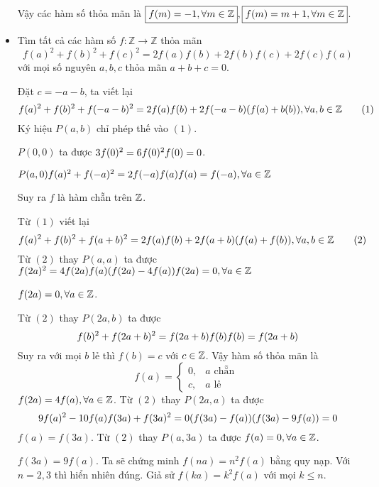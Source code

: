 \documentclass[11pt]{scrartcl}
\begin{document}
\begin{itemize}[label=, leftmargin=0em, itemsep=0.5em]
\begin{sol}
        Vậy các hàm số thỏa mãn là $\boxed{f(m) = -1, \forall m \in \mathbb{Z}},\boxed{f(m) = m +1, \forall m \in \mathbb{Z}}$.
    \end{sol}
    \item \begin{bt}
        Tìm tất cả các hàm số $f: \mathbb{Z} \to \mathbb{Z}$ thỏa mãn
        \[
          f(a)^2 + f(b)^2 + f(c)^2 = 2f(a)f(b) + 2f(b)f(c) + 2f(c)f(a)
        \]
        với mọi số nguyên $a,b,c$ thỏa mãn $a + b + c = 0$.
    \end{bt}
    \begin{sol}
        Đặt $c = - a - b$, ta viết lại 
        \[
            f(a)^2 + f(b)^2 + f(-a-b)^2 = 2f(a)f(b) +2f(-a-b)(f(a) + b(b)), \forall a,b \in \mathbb{Z} \tag{1}
        \]
        Ký hiệu $P(a,b)$ chỉ phép thế vào $(1)$. 
        
        $P(0,0)$ ta được $3f(0)^2 = 6f(0)^2 \ra f(0) = 0$. 

        $P(a,0) \ra f(a)^2 + f(-a)^2 = 2f(-a)f(a) \lra f(a) = f(-a),\forall a \in \bb{Z}$

        Suy ra $f$ là hàm chẵn trên $\mathbb{Z}$.

        Từ $(1)$ viết lại 
        \[
            f(a)^2 + f(b)^2 + f(a + b)^2 = 2f(a)f(b) + 2f(a + b)(f(a) + f(b)),\forall a,b \in \mathbb{Z} \tag{2}
        \]
        Từ $(2)$ thay $P(a,a)$ ta được
        \(
            f(2a)^2 = 4f(2a)f(a) \lra (f(2a) - 4f(a))f(2a) = 0,\forall a \in \bb{Z}
        \)

         $f(2a) = 0, \forall a \in \mathbb{Z}$. 

        Từ $(2)$ thay $P(2a,b)$ ta được
        \[
            f(b)^2 + f(2a + b)^2 = f(2a + b)f(b) \lra f(b) = f(2a + b) 
        \]
        Suy ra với mọi $b$ lẻ thì $f(b) = c$ với $c \in \mathbb{Z}$. Vậy hàm số thỏa mãn là 
        \[\boxed{ f(a)=
        \left\{\begin{array}{rr}0,&a \text{ chẵn }\\
            c,&a \text{ lẻ }
        \end{array}
        \right.
        }
        \]
         $f(2a) = 4f(a), \forall a \in \mathbb{Z}$. Từ $(2)$ thay $P(2a,a)$ ta được 
        \[
             9f(a)^2 - 10f(a)f(3a) + f(3a)^2 = 0 \lra (f(3a) - f(a))(f(3a) - 9f(a)) = 0
        \]
         $f(a) = f(3a)$. Từ $(2)$ thay $P(a,3a)$ ta được $f(a) = 0, \forall a \in \mathbb{Z}$.

         $f(3a) = 9f(a)$. Ta sẽ chứng minh $f(na) = n^2f(a)$ bằng quy nạp. Với $n = 2,3$ thì hiển nhiên đúng. Giả sử $f(ka) = k^2f(a)$ với mọi $k \leq n$.
        

\end{sol}
\end{itemize}
\end{document}
